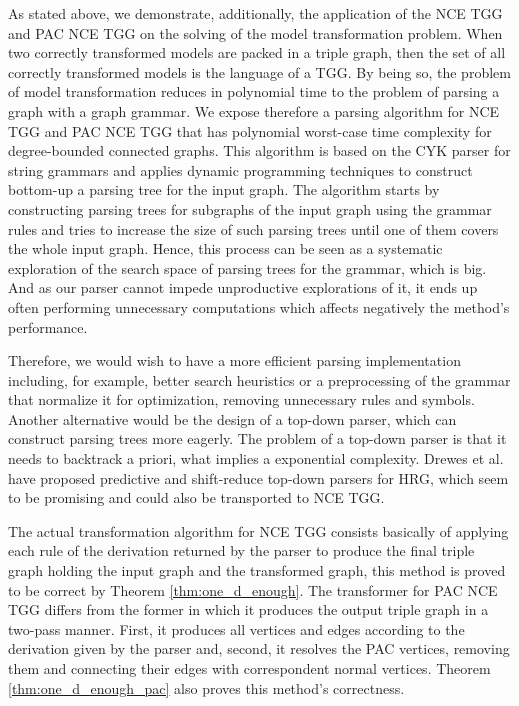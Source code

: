 As stated above, we demonstrate, additionally, the application of the NCE TGG and PAC NCE TGG on the solving of the model transformation problem. When two correctly transformed models are packed in a triple graph, then the set of all correctly transformed models is the language of a TGG. By being so, the problem of model transformation reduces in polynomial time to the problem of parsing a graph with a graph grammar. We expose therefore a parsing algorithm for NCE TGG \cite{rozenberg1986boundary} and PAC NCE TGG that has polynomial worst-case time complexity for degree-bounded connected graphs. This algorithm is based on the CYK parser for string grammars and applies dynamic programming techniques to construct bottom-up a parsing tree for the input graph. The algorithm starts by constructing parsing trees for subgraphs of the input graph using the grammar rules and tries to increase the size of such parsing trees until one of them covers the whole input graph. Hence, this process can be seen as a systematic exploration of the search space of parsing trees for the grammar, which is big. And as our parser cannot impede unproductive explorations of it, it ends up often performing unnecessary computations which affects negatively the method's performance.

Therefore, we would wish to have a more efficient parsing implementation including, for example, better search heuristics or a preprocessing of the grammar that normalize it for optimization, removing unnecessary rules and symbols. Another alternative would be the design of a top-down parser, which can construct parsing trees more eagerly. The problem of a top-down parser is that it needs to backtrack a priori, what implies a exponential complexity. Drewes et al. \cite{drewes2015predictive,drewes2017predictive} have proposed predictive and shift-reduce top-down parsers for HRG, which seem to be promising and could also be transported to NCE TGG.
 
The actual transformation algorithm for NCE TGG consists basically of applying each rule of the derivation returned by the parser to produce the final triple graph holding the input graph and the transformed graph, this method is proved to be correct by Theorem \ref{thm:one_d_enough}. The transformer for PAC NCE TGG differs from the former in which it produces the output triple graph in a two-pass manner. First, it produces all vertices and edges according to the derivation given by the parser and, second, it resolves the PAC vertices, removing them and connecting their edges with correspondent normal vertices. Theorem \ref{thm:one_d_enough_pac} also proves this method's correctness.

